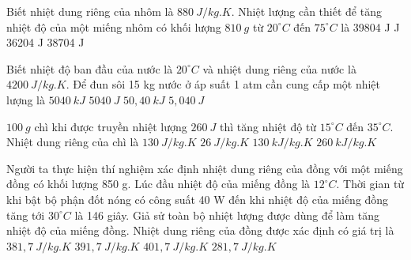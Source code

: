 \begin{ex}
	 Biết nhiệt dung riêng của nhôm là $880 \ J / kg . K$. Nhiệt lượng cần thiết để tăng nhiệt độ của một miếng nhôm có khối lượng $810 \ g$ từ $20^\circ C$ đến $75^\circ C$ là
	\choice
	{39804 J}
	{ J}
	{36204 J}
	{38704 J}
	\end{ex}
\begin{ex} 
	Biết nhiệt độ ban đầu của nước là $20^\circ C$ và nhiệt dung riêng của nước là $4200 \ J / kg . K$. Để đun sôi 15 kg nước ở áp suất 1 atm cần cung cấp một nhiệt lượng là 
	\choice
	{\True $5040 \ k J$}
	{$5040 \ J$}
	{$50,40 \ k J$}
	{$5,040 \ J$}
	
\end{ex}





\begin{ex} 
	$100\ g$ chì khi được truyền nhiệt lượng $260\ J$  thì tăng nhiệt độ từ $15^\circ C$ đến $35^\circ C$. Nhiệt dung riêng của chì là
	\choice
	{\True $130\ J/kg . K$}
	{$26\ J/kg . K$}
	{$130\ kJ/kg . K$}
	{$260\ kJ/kg . K$}
\end{ex}

\begin{ex}
	Người ta thực hiện thí nghiệm xác định nhiệt dung riêng của đồng với một miếng đồng có khối lượng 850 g. Lúc đầu nhiệt độ của miếng đồng là $12^\circ C$. Thời gian từ khi bật bộ phận đốt nóng có công suất 40 W đến khi nhiệt độ của miếng đồng tăng tới $30^\circ C$ là 146 giây. Giả sử toàn bộ nhiệt lượng được dùng để làm tăng nhiệt độ của miếng đồng. Nhiệt dung riêng của đồng được xác định có giá trị là
	\choice
	{\True $381,7\ J/kg.K$}
	{$391,7\ J/kg.K$}
	{$401,7\ J/kg.K$}
	{$281,7\ J/kg.K$}
	\end{ex}









